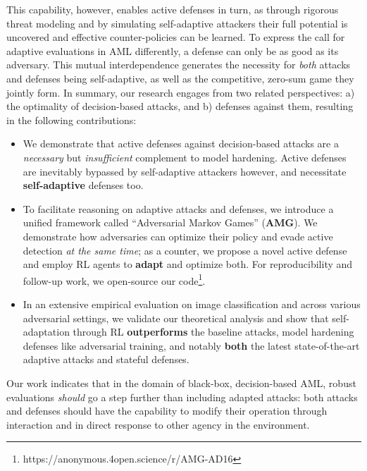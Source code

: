 This capability, however, enables active defenses in turn, as through rigorous threat modeling and by simulating self-adaptive attackers their full potential is uncovered and effective counter-policies can be learned.
To express the call for adaptive evaluations in \gls{AML} differently, a defense can only be as good as its adversary.
This mutual interdependence generates the necessity for \emph{both} attacks and defenses being self-adaptive, as well as the competitive, zero-sum game they jointly form.
In summary, our research engages from two related perspectives: a) the optimality of decision-based attacks, and b) defenses against them, resulting in the following contributions:

\begin{itemize} %
\item We demonstrate that active defenses against decision-based attacks are a \textit{necessary} but \textit{insufficient} complement to model hardening.
Active defenses are inevitably bypassed by self-adaptive attackers however, and necessitate \textbf{self-adaptive} defenses too.
\item To facilitate reasoning on adaptive attacks and defenses, we introduce a unified framework called ``Adversarial Markov Games'' (\textbf{AMG}).
We demonstrate how adversaries can optimize their policy and evade active detection \textit{at the same time}; as a counter, we propose a novel active defense and employ RL agents to \textbf{adapt} and optimize both.
For reproducibility and follow-up work, we open-source our code\footnote{https://anonymous.4open.science/r/AMG-AD16}.
\item In an extensive empirical evaluation on image classification and across various adversarial settings, we validate our theoretical analysis and show that self-adaptation through RL \textbf{outperforms} the baseline attacks, model hardening defenses like adversarial training, and notably \textbf{both} the latest state-of-the-art adaptive attacks and stateful defenses.
\end{itemize}

Our work indicates that in the domain of black-box, decision-based \gls{AML}, robust evaluations \textit{should} go a step further than including adapted attacks: both attacks and defenses should have the capability to modify their operation through interaction and in direct response to other agency in the environment.

